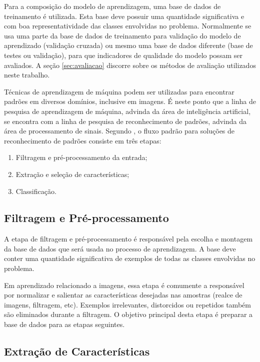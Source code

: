 Para a composição do modelo de aprendizagem, uma base de dados de treinamento é utilizada. Esta base deve possuir uma quantidade significativa e com boa representatividade das classes envolvidas no problema. Normalmente se usa uma parte da base de dados de treinamento para validação do modelo de aprendizado (validação cruzada) ou mesmo uma base de dados diferente (base de testes ou validação), para que indicadores de qualidade do modelo possam ser avaliados. A seção \ref{sec:avaliacao} discorre sobre os métodos de avaliação utilizados neste trabalho.

Técnicas de aprendizagem de máquina podem ser utilizadas para encontrar padrões em diversos domínios, inclusive em imagens. É neste ponto que a linha de pesquisa de aprendizagem de máquina, advinda da área de inteligência artificial, se encontra com a linha de pesquisa de reconhecimento de padrões, advinda da área de processamento de sinais. Segundo , o fluxo padrão para soluções de reconhecimento de padrões consiste em três etapas:

\begin{enumerate}
    \item Filtragem e pré-processamento da entrada;
    \item Extração e seleção de características;
    \item Classificação.
\end{enumerate}


\subsection{Filtragem e Pré-processamento}

A etapa de filtragem e pré-processamento é responsável pela escolha e montagem da base de dados que será usada no processo de aprendizagem. A base deve conter uma quantidade significativa de exemplos de todas as classes envolvidas no problema.

Em aprendizado relacionado a imagens, essa etapa é comumente a responsável por normalizar e salientar as características desejadas nas amostras (realce de imagens, filtragem, etc). Exemplos irrelevantes, distorcidos ou repetidos também são eliminados durante a filtragem. O objetivo principal desta etapa é preparar a base de dados para as etapas seguintes.


\subsection{Extração de Características}

